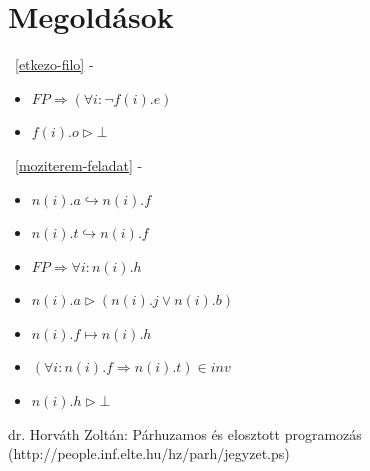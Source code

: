 \documentclass[12pt]{article}
\begin{document}
\section{Megoldások}
	~\ref{etkezo-filo} - 
	\begin{itemize}
		\item $FP \Rightarrow (\forall i: \neg f(i).e)$
		\item $f(i).o \vartriangleright \bot$
	\end{itemize}
	~\ref{moziterem-feladat} - 
	\begin{itemize}
		\item $n(i).a \hookrightarrow n(i).f $
		\item $n(i).t \hookrightarrow n(i).f$
		\item $FP \Rightarrow \forall i : n(i).h$
		\item $n(i).a \vartriangleright (n(i).j \lor n(i).b)$
		\item $n(i).f \mapsto n(i).h$
		\item $(\forall i: n(i).f \Rightarrow n(i).t) \in inv$
		\item $n(i).h \vartriangleright \bot$
	\end{itemize}

\begin{thebibliography}{9}
\raggedright
dr. Horváth Zoltán: Párhuzamos és elosztott programozás (http://people.inf.elte.hu/hz/parh/jegyzet.ps)

\end{thebibliography}
\end{document}
